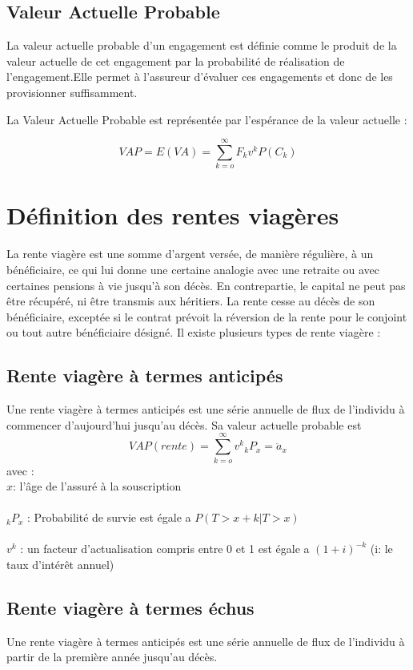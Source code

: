 \documentclass[french]{report}
\begin{document}
 \subsection{Valeur Actuelle Probable }
La valeur actuelle probable d’un engagement est définie comme le produit de la valeur actuelle de cet engagement par la probabilité de réalisation de l’engagement.Elle permet à l’assureur d’évaluer ces engagements et donc de les provisionner suffisamment. \cite{VAP}
 
\newline
\newline La Valeur Actuelle Probable est représentée par l'espérance de la valeur actuelle :

  \[ VAP = E(VA) = \sum_{k=o}^{\infty}F_{k}v^{k}P(C_{k})\]
 

\section {Définition des rentes viagères}
La rente viagère est une somme d’argent versée, de manière régulière, à un bénéficiaire, ce qui lui donne une certaine analogie avec une retraite ou avec certaines pensions à vie jusqu’à son décès. En contrepartie, le capital ne peut pas être récupéré, ni être transmis aux héritiers. 
La rente cesse au décès de son bénéficiaire, exceptée si le contrat prévoit la réversion de la rente pour le conjoint ou tout autre bénéficiaire désigné.\cite{renteV}\newline
Il existe plusieurs types de rente viagère : 
\subsection {Rente viagère à termes anticipés}
Une rente viagère à termes anticipés est une série annuelle de flux  de
l’individu à commencer d’aujourd’hui jusqu’au décès. \cite{Cours}
\newline Sa valeur actuelle probable est  
 \[ VAP(rente) = \sum_{k=o}^{\infty}v^{k}   {}_k P_{x}= \ddot {a}_{x}\]
avec : \\
$x$: l'âge de l’assuré à la souscription \\ \\
$ {}_k P_{x}$ : Probabilité de survie est égale a $P(T>x+k| T>x)$ \\ \\
 $v^{k}$ : un facteur d’actualisation compris entre 0 et  1 est égale a $ (1+i)^{-k} $ (i: le taux d’intérêt annuel)
 

\subsection {Rente viagère à termes échus}
Une rente viagère à termes anticipés est une série annuelle de flux  de
l’individu à partir de la première année jusqu’au décès. \cite{Cours}
\end{document}
